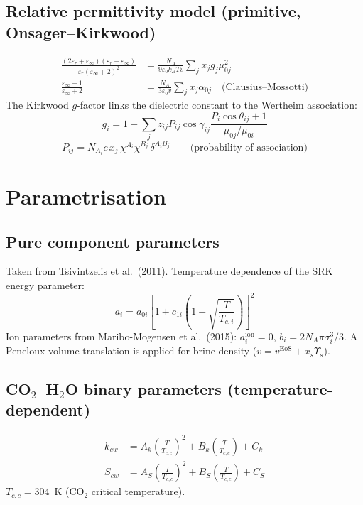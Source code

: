 \documentclass[11pt]{article}
\begin{document}
\subsection{Relative permittivity model (primitive, Onsager--Kirkwood)}
\begin{align}
  \frac{(2\varepsilon_r+\varepsilon_\infty)(\varepsilon_r-\varepsilon_\infty)}
       {\varepsilon_r(\varepsilon_\infty+2)^2}
    &= \frac{N_A}{9\varepsilon_0 k_B T v} \sum_j x_j g_j \mu_{0j}^2
  \label{eq:permittivity}\\
  \frac{\varepsilon_\infty-1}{\varepsilon_\infty+2}
    &= \frac{N_A}{3\varepsilon_0 v}\sum_j x_j \alpha_{0j}
  \quad \text{(Clausius--Mossotti)}
\end{align}
The Kirkwood $g$-factor links the dielectric constant to the Wertheim association:
\begin{equation}
  g_i = 1 + \sum_j z_{ij} P_{ij}
    \cos\gamma_{ij}\frac{P_i\cos\theta_{ij}+1}{\mu_{0j}/\mu_{0i}}
\end{equation}
\begin{equation}
  P_{ij} = N_{A_i} c\, x_j\, \chi^{A_i} \chi^{B_j}\, \delta^{A_iB_j}
  \qquad \text{(probability of association)}
\end{equation}

\section{Parametrisation}

\subsection{Pure component parameters}
Taken from Tsivintzelis et al.\ (2011). Temperature dependence of the SRK energy parameter:
\begin{equation}
  a_i = a_{0i}\left[1 + c_{1i}\!\left(1 - \sqrt{\frac{T}{T_{c,i}}}\right)\right]^2
\end{equation}
Ion parameters from Maribo-Mogensen et al.\ (2015): $a_i^{\text{ion}}=0$,
$b_i = 2N_A\pi\sigma_i^3/3$. A Peneloux volume translation is applied for brine
density ($v = v^{\text{EoS}} + x_s\Upsilon_s$).

\subsection{CO$_2$--H$_2$O binary parameters (temperature-dependent)}
\begin{align}
  k_{cw} &= A_k\!\left(\frac{T}{T_{c,c}}\right)^2 + B_k\!\left(\frac{T}{T_{c,c}}\right) + C_k
  \label{eq:kcw}\\
  S_{cw} &= A_S\!\left(\frac{T}{T_{c,c}}\right)^2 + B_S\!\left(\frac{T}{T_{c,c}}\right) + C_S
  \label{eq:Scw}
\end{align}
$T_{c,c} = 304$~K (CO$_2$ critical temperature).
\end{document}
